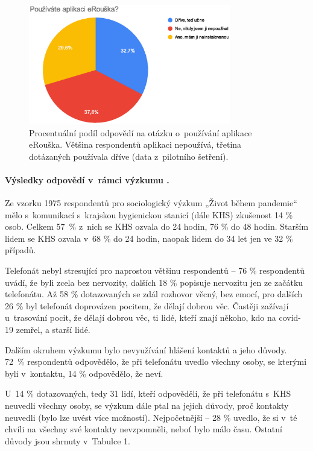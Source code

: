 \begin{figure}[h!]
\begin{center}
    \includegraphics[width=250pt]{./pic/graf3.eps}
 \end{center}    
\caption{Procentuální podíl odpovědí na otázku o~používání aplikace eRouška. Většina respondentů aplikaci nepoužívá, třetina dotázaných používala dříve  (data z~pilotního šetření).}
 \end{figure}
 
\pagebreak
\paragraph* {Výsledky odpovědí v~rámci výzkumu .}
Ze vzorku 1975 respondentů pro sociologický výzkum „Život během pandemie“ mělo s~komunikací s~krajskou hygienickou stanicí (dále KHS) zkušenost 14 \% osob. Celkem 57~\% z~nich se KHS ozvala do 24 hodin, 76 \% do 48 hodin. Starším lidem se KHS ozvala v~68 \% do 24 hodin, naopak lidem do 34 let jen ve 32 \% případů. 

Telefonát nebyl stresující pro naprostou většinu respondentů -- 76 \% respondentů uvádí, že byli zcela bez nervozity, dalších 18 \% popisuje nervozitu jen ze začátku telefonátu. Až 58 \% dotazovaných se zdál rozhovor věcný, bez emocí, pro dalších 26 \% byl telefonát doprovázen pocitem, že dělají dobrou věc. Častěji zažívají u~trasování pocit, že dělají dobrou věc, ti lidé, kteří znají někoho, kdo na covid-19 zemřel, a starší lidé.

Dalším okruhem výzkumu bylo nevyužívání hlášení kontaktů a jeho důvody. 72~\% respondentů odpovědělo, že při telefonátu uvedlo všechny osoby, se kterými byli v~kontaktu, 14 \% odpovědělo, že neví. 

U~14 \% dotazovaných, tedy 31 lidí, kteří odpověděli, že při telefonátu s~KHS neuvedli všechny osoby, se výzkum dále ptal na jejich důvody, proč kontakty neuvedli (bylo lze uvést více možností). Nejpočetnější -- 28 \% uvedlo, že si v~té chvíli na všechny své kontakty nevzpomněli, neboť bylo málo času. Ostatní důvody jsou shrnuty v~Tabulce 1.


